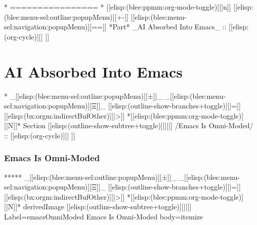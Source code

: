 \begin{whenOrg}
\begin{verblatex}
\begin{frame}[fragile,plain,label=continuityProblem]

\end{frame}
\end{verblatex}



\begin{whenOrg}
*      ================
*  [[elisp:(blee:ppmm:org-mode-toggle)][|n]] [[elisp:(blee:menu-sel:outline:popupMenu)][+-]] [[elisp:(blee:menu-sel:navigation:popupMenu)][==]]  *Part*   _AI Absorbed Into Emacs_ ::  [[elisp:(org-cycle)][| ]]
\end{whenOrg}

\newpage
\part{AI Absorbed Into Emacs}

\begin{whenOrg}
*  _[[elisp:(blee:menu-sel:outline:popupMenu)][±]]_ _[[elisp:(blee:menu-sel:navigation:popupMenu)][Ξ]]_ [[elisp:(outline-show-branches+toggle)][|=]] [[elisp:(bx:orgm:indirectBufOther)][|>]] *[[elisp:(blee:ppmm:org-mode-toggle)][|N]]*  Section    [[elisp:(outline-show-subtree+toggle)][||]]   /Emacs Is Omni-Moded/ ::  [[elisp:(org-cycle)][| ]]
\end{whenOrg}

\section{Emacs Is Omni-Moded}

\begin{whenOrg}
*****  _[[elisp:(blee:menu-sel:outline:popupMenu)][±]]_ _[[elisp:(blee:menu-sel:navigation:popupMenu)][Ξ]]_ [[elisp:(outline-show-branches+toggle)][|=]] [[elisp:(bx:orgm:indirectBufOther)][|>]] *[[elisp:(blee:ppmm:org-mode-toggle)][|N]]*  derivedImage [[elisp:(outline-show-subtree+toggle)][||]] Label=emacsOmniModed Emacs Is Omni-Moded body=itemize
\end{whenOrg}


\end{whenOrg}
